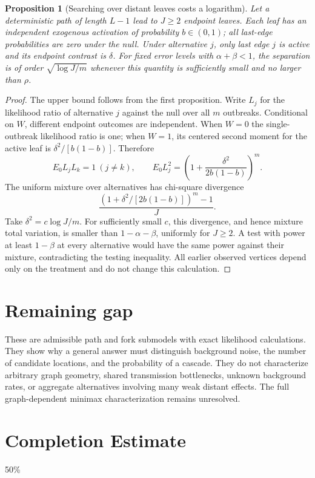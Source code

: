 \documentclass[11pt]{article}
\newtheorem{proposition}[theorem]{Proposition}
\theoremstyle{remark}
\begin{document}
\begin{proposition}[Searching over distant leaves costs a logarithm]
Let a deterministic path of length $L-1$ lead to $J\ge2$ endpoint leaves. Each leaf has an independent exogenous activation of probability $b\in(0,1)$; all last-edge probabilities are zero under the null. Under alternative $j$, only last edge $j$ is active and its endpoint contrast is $\delta$. For fixed error levels with $\alpha+\beta<1$, the separation is of order $\sqrt{\log J/m}$ whenever this quantity is sufficiently small and no larger than $\rho$.
\end{proposition}
\begin{proof}
The upper bound follows from the first proposition. Write $L_j$ for the likelihood ratio of alternative $j$ against the null over all $m$ outbreaks. Conditional on $W$, different endpoint outcomes are independent. When $W=0$ the single-outbreak likelihood ratio is one; when $W=1$, its centered second moment for the active leaf is $\delta^2/[b(1-b)]$. Therefore
\[
 E_0L_jL_k=1\ (j\ne k),\qquad
 E_0L_j^2=\left(1+\frac{\delta^2}{2b(1-b)}\right)^m.
\]
The uniform mixture over alternatives has chi-square divergence
\[
 \frac{(1+\delta^2/[2b(1-b)])^m-1}{J}.
\]
Take $\delta^2=c\log J/m$. For sufficiently small $c$, this divergence, and hence mixture total variation, is smaller than $1-\alpha-\beta$, uniformly for $J\ge2$. A test with power at least $1-\beta$ at every alternative would have the same power against their mixture, contradicting the testing inequality. All earlier observed vertices depend only on the treatment and do not change this calculation.
\end{proof}

\section*{Remaining gap}
These are admissible path and fork submodels with exact likelihood calculations. They show why a general answer must distinguish background noise, the number of candidate locations, and the probability of a cascade. They do not characterize arbitrary graph geometry, shared transmission bottlenecks, unknown background rates, or aggregate alternatives involving many weak distant effects. The full graph-dependent minimax characterization remains unresolved.

\section{Completion Estimate}
50\%
\end{document}
